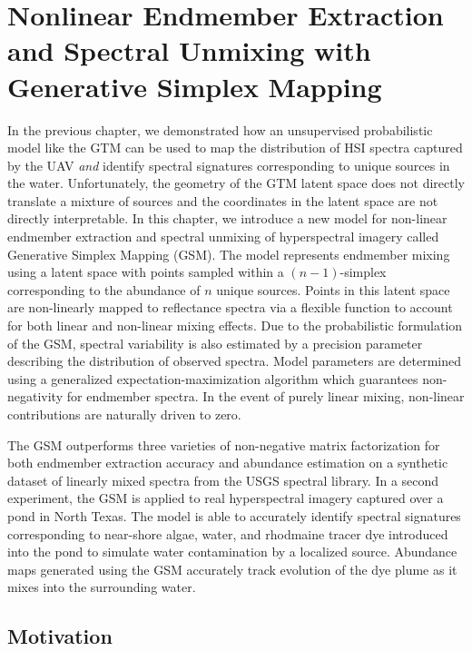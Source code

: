 \chapter{Nonlinear Endmember Extraction and Spectral Unmixing with Generative Simplex Mapping}\label{ch:robot-team-gsm}


In the previous chapter, we demonstrated how an unsupervised probabilistic model
like the GTM can be used to map the distribution of HSI spectra captured by the
UAV \textit{and} identify spectral signatures corresponding to unique sources in
the water. Unfortunately, the geometry of the GTM latent space does not
directly translate a mixture of sources and the coordinates in the latent space
are not directly interpretable. In this chapter, we introduce a new model for
non-linear endmember extraction and spectral unmixing of hyperspectral imagery
called Generative Simplex Mapping (GSM). The model represents endmember mixing
using a latent space with points sampled within a $(n-1)$-simplex corresponding
to the abundance of $n$ unique sources. Points in this latent space are
non-linearly mapped to reflectance spectra via a flexible function to account for
both linear and non-linear mixing effects. Due to the probabilistic formulation
of the GSM, spectral variability is also estimated by a precision parameter
describing the distribution of observed spectra. Model parameters are determined
using a generalized expectation-maximization algorithm which guarantees
non-negativity for endmember spectra. In the event of purely
linear mixing, non-linear contributions are naturally driven to zero.

The GSM outperforms three varieties of non-negative matrix factorization for both
endmember extraction accuracy and abundance estimation on a synthetic dataset
of linearly mixed spectra from the USGS spectral library. In a second
experiment, the GSM is applied to real hyperspectral imagery captured over a
pond in North Texas. The model is able to accurately identify spectral
signatures corresponding to near-shore algae, water, and rhodmaine tracer dye
introduced into the pond to simulate water contamination by a localized
source. Abundance maps generated using the GSM accurately track evolution of
the dye plume as it mixes into the surrounding water.


\section{Motivation}


